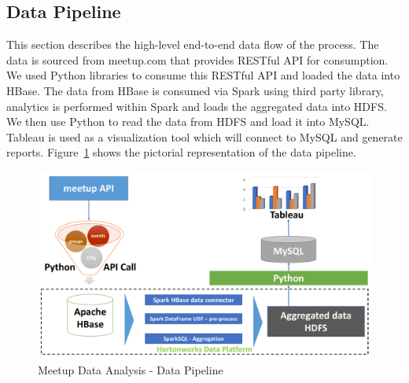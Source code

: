 \documentclass{acm_proc_article-sp}
\begin{document}
\subsection{Data Pipeline}
This section describes the high-level end-to-end data flow of the process.  The data is sourced from meetup.com that provides RESTful API for consumption.  We used Python libraries to consume this RESTful API  and loaded the data into HBase.  The data from HBase is consumed via Spark using third party library, analytics is performed within Spark and loads the aggregated data into HDFS.  We then use Python to read the data from HDFS and load it into MySQL.  Tableau is used as a visualization tool which will connect to MySQL and generate reports.  Figure~\ref{F:pipeline} shows the pictorial representation of the data pipeline.
\begin{figure}[!ht]
  \centering
      \includegraphics[width=1.0\columnwidth]{images/data_pipeline.pdf}
  \caption{Meetup Data Analysis - Data Pipeline}\label{F:pipeline}
\end{figure}
\end{document}

